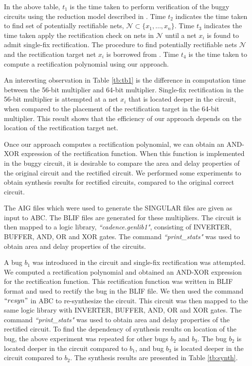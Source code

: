 In the above table, $t_1$ is the time taken to perform verification of the buggy circuits using the reduction model described in \cite{Armin2017ColumnWiseVO}. Time $t_2$ indicates the time taken to find set of potentially rectifiable nets, $\mathcal{N} \subset \{x_1,\dots,x_n\}$. Time $t_3$ indicates the time taken apply the rectification check on nets in $\mathcal{N}$ until a net $x_i$ is found to admit single-fix rectification. The procedure to find potentially rectifiable nets $\mathcal{N}$ and the rectification target net $x_i$ is borrowed from \cite{utkarsh:fmcad18}. Time $t_4$ is the time taken to compute a rectification polynomial using our approach. 

An interesting observation in Table \ref{tb:tb1} is the difference in computation time between the 56-bit multiplier and 64-bit multiplier. Single-fix rectification in the 56-bit multiplier is attempted at a net $x_i$ that is located deeper in the circuit, when compared to the placement of the rectification target in the 64-bit multiplier. This result shows that the efficiency of our approach depends on the location of the rectification target net.

Once our approach computes a rectification polynomial, we can obtain an AND-XOR expression of the rectification function. When this function is implemented in the buggy circuit, it is desirable to compare the area and delay properties of the original circuit and the rectified circuit. We performed some experiments to obtain synthesis results for rectified circuits, compared to the original correct circuit. 

The AIG files which were used to generate the SINGULAR files are given as input to ABC. The BLIF files are generated for these multipliers. The circuit is then mapped to a logic library,  \textit{``cadence.genlib1"}, consisting of INVERTER, BUFFER, AND, OR and XOR gates. The command \textit{``print\_stats"} was used to obtain area and delay properties of the circuits. 

A bug $b_1$ was introduced in the circuit and single-fix rectification was attempted. We computed a rectification polynomial and obtained an AND-XOR expression for the rectification function. This rectification function was written in BLIF format and used to rectify the bug in the BLIF file. We then used the command $``resyn"$ in ABC to re-synthesize the circuit. This circuit was then mapped to the same logic library with INVERTER, BUFFER, AND, OR and XOR gates. The command \textit{``print\_stats"} was used to obtain area and delay properties of the rectified circuit. To find the dependency of synthesis results on location of the bug, the above experiment was repeated for other bugs $b_2$ and $b_3$. The bug $b_2$ is located deeper in the circuit compared to $b_1$, and bug $b_3$ is located deeper in the circuit compared to $b_2$. The synthesis results are presented in Table \ref{tb:synth}.

